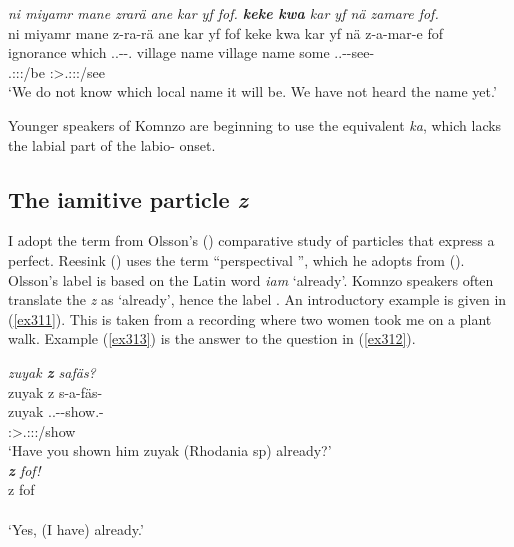 \begin{exe}
	\ex \emph{ni miyamr mane zrarä ane kar yf fof. \textbf{keke kwa} kar yf nä zamare fof.}\\
	\glll ni miyamr mane z-ra-rä ane kar yf fof keke kwa kar yf nä z-a-mar-e fof\\
	\Fnsg{} ignorance which \Tsg.\F.\Bet-\Irr-\Cop.\Ndu{} \Dem{} village name \Emph{} \Neg{} \Fut{} village name some \Tsg.\F.\Gam-\Ndu-see-\Fnsg{} \Emph{}\\
	{} {} {} \footnotesize{\Tsg.\F:\Sbj:\Irr:\Ipfv/be} {} {} {} {} {} {} {} {} {} \footnotesize{\Fpl:\Sbj>\Tsg.\F:\Obj:\Rpst:\Pfv/see} {}\\
	\trans `We do not know which local name it will be. We have not heard the name yet.' 
	\label{ex367}
\end{exe}

Younger speakers of Komnzo are beginning to use the  equivalent \emph{ka}, which lacks the labial part of the labio- onset.

\subsection{The iamitive particle \emph{z}}\label{iamitivez}

I adopt the term  from Olsson's (\citeyear{Olsson:2013vn}) comparative study of particles that express a perfect. Reesink (\citeyear[184]{Reesink:2009bird}) uses the term ``perspectival '', which he adopts from (\citealt{Dik:1997uj}). Olsson's label is based on the Latin word \emph{iam} `already'. Komnzo speakers often translate the   \emph{z} as `already', hence the  label \Iam{}. An introductory example is given in (\ref{ex311}). This is taken from a recording where two women took me on a plant walk. Example (\ref{ex313}) is the answer to the question in (\ref{ex312}).

\begin{exe}
\ex \label{ex311}
\begin{xlist}
	\ex \emph{zuyak \textbf{z} safäs?}\\
	\glll zuyak z s-a-fäs-\Zero{}\\
	zuyak \Iam{} \Tsg.\Masc.\Gam-\Ndu-show.\Rs-\Stsg{}\\
	{} {} \footnotesize{\Stsg:\Sbj>\Tsg.\Masc:\Obj:\Nonpast:\Pfv/show}\\
	\trans `Have you shown him zuyak (Rhodania sp) already?'\\ 
	\label{ex312}
	\ex \emph{\textbf{z} fof!}\\
	\gll z fof\\
	\Iam{} \Emph{}\\
	\trans `Yes, (I have) already.' 
	\label{ex313}
\end{xlist}
\end{exe}

